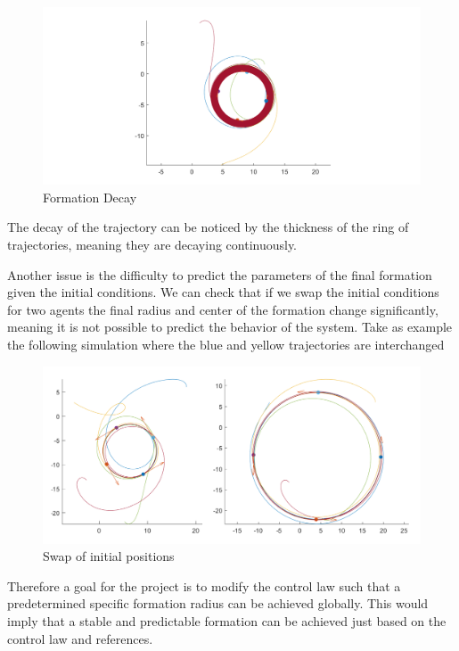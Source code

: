 \begin{figure}[H]
	\includegraphics[width=\linewidth]{Attachments/Figure31.png}
	\caption{Formation Decay}
	\label{fig:Decay}
\end{figure}

The decay of the trajectory can be noticed by the thickness of the ring of trajectories, meaning they are decaying continuously.

Another issue is the difficulty to predict the parameters of the final formation given the initial conditions. We can check that if we swap the initial conditions for two agents the final radius and center of the formation change significantly, meaning it is not possible to predict the behavior of the system. Take as example the following simulation where the blue and yellow trajectories are interchanged

\begin{figure}[H]
	\includegraphics[width=\linewidth]{Attachments/Figure32.png}
	\caption{Swap of initial positions}
	\label{fig:Swap}
\end{figure}

Therefore a goal for the project is to modify the control law such that a predetermined specific formation radius can be achieved globally. This would imply that a stable and predictable formation can be achieved just based on the control law and references.

